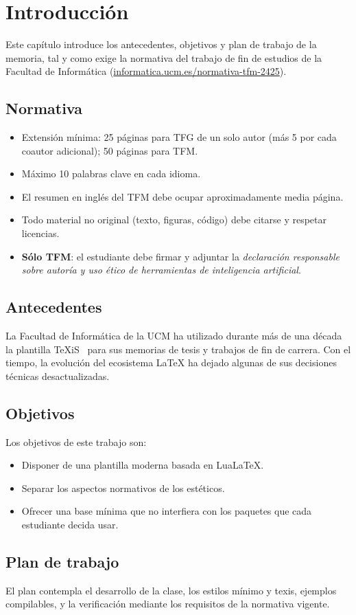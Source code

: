 \chapter{Introducción}

Este capítulo introduce los antecedentes, objetivos y plan de
trabajo de la memoria, tal y como exige la normativa del trabajo
de fin de estudios de la Facultad de Informática
(\href{https://informatica.ucm.es/normativa-tfm-2425}{informatica.ucm.es/normativa-tfm-2425}).

\section{Normativa}

\begin{itemize}\setlength{\itemsep}{0pt}
  \item Extensión mínima: 25 páginas para TFG de un solo autor (más
        5 por cada coautor adicional); 50 páginas para TFM.
  \item Máximo 10 palabras clave en cada idioma.
  \item El resumen en inglés del TFM debe ocupar
        aproximadamente media página.
  \item Todo material no original (texto, figuras, código) debe
        citarse y respetar licencias.
  \item \textbf{Sólo TFM}: el estudiante debe firmar y adjuntar la
        \emph{declaración responsable sobre autoría y uso ético de
        herramientas de inteligencia artificial}.
\end{itemize}

\section{Antecedentes}

La Facultad de Informática de la UCM ha utilizado durante más de
una década la plantilla TeXiS~\cite{texis} para sus memorias de
tesis y trabajos de fin de carrera. Con el tiempo, la evolución
del ecosistema LaTeX ha dejado algunas de sus decisiones
técnicas desactualizadas.

\section{Objetivos}

Los objetivos de este trabajo son:
\begin{itemize}
  \item Disponer de una plantilla moderna basada en LuaLaTeX.
  \item Separar los aspectos normativos de los estéticos.
  \item Ofrecer una base mínima que no interfiera con los
        paquetes que cada estudiante decida usar.
\end{itemize}

\section{Plan de trabajo}

El plan contempla el desarrollo de la clase, los estilos mínimo
y texis, ejemplos compilables, y la verificación mediante los
requisitos de la normativa vigente.
